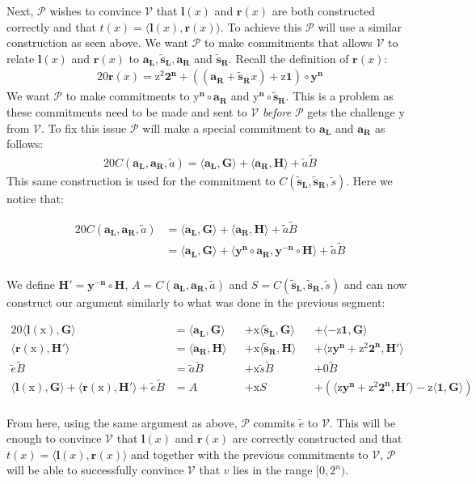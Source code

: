 \documentclass{article}
\newcommand{\eq}[1]{\begin{alignat*}{20}#1\end{alignat*}}
\renewcommand{\vec}[1]{\boldsymbol{#1}}
\newcommand{\ran}[1]{\mathrm{#1}}
\newcommand{\vecran}[1]{\mathbf{#1}}
\newcommand{\V}{\mathcal{V}}
\renewcommand{\P}{\mathcal{P}}
\newcommand{\dotp}[2]{\langle #1, #2 \rangle}
\newcommand{\opn}[1]{\operatorname{#1}}
\newcommand{\vecl}[1]{\vec{#1_{\opn{L}}}}
\newcommand{\vecr}[1]{\vec{#1_{\opn{R}}}}
\newcommand{\blind}[1]{\widetilde{#1}}
\newcommand{\ba}{\blind{a}}
\newcommand{\bB}{\blind{B}}
\newcommand{\be}{\blind{e}}
\newcommand{\bs}{\blind{s}}
\begin{document}
Next, $\P$ wishes to convince $\V$ that $\vec{l}(x)$ and
$\vec{r}(x)$ are both constructed correctly and that $t(x) =
\dotp{\vec{l}(x)}{\vec{r}(x)}$. To achieve this $\P$ will use a similar
construction as seen above. We want $\P$ to make commitments that allows
$\V$ to relate $\vec{l}(x)$ and $\vec{r}(x)$ to $\vecl{a}, \vecl{\bs},
\vecr{a}$ and $\vecr{\bs}$. Recall the definition of $\vec{r}(x)$:
\eq{
	\vec{r}(x) = \ran{z^2}\vec{2^n} + ((\vecr{a} + \vecr{\bs}x) + \ran{z}\vec{1})\circ\vecran{y}^{\vec{n}}
}
We want $\P$ to make commitments to $\vec{\ran{y}^n}\circ
\vecr{a}$ and $\vec{\ran{y}^n}\circ\vecr{\bs}$. This is a problem as these
commitments need to be made and sent to $\V$ \textit{before} $\P$
gets the challenge $\ran{y}$ from $\V$. To fix this issue $\P$ will
make a special commitment to $\vecl{a}$ and $\vecr{a}$ as follows:
\eq{
	C(\vecl{a}, \vecr{a}, \ba) = \dotp{\vecl{a}}{\vec{G}} + \dotp{\vecr{a}}{\vec{H}} + \ba\bB
}
This same construction is used for the commitment to $C(\vecl{\bs},
\vecr{\bs}, \bs)$. Here we notice that:

\eq{
	C(\vecl{a}, \vecr{a}, \ba) &= \dotp{\vecl{a}}{\vec{G}} + \dotp{\vecr{a}}{\vec{H}} + \ba\bB \\
	&= \dotp{\vecl{a}}{\vec{G}} + \dotp{\vecran{y}^{\vec{n}}\circ \vecr{a}}{\vecran{y^{-n}}\circ \vec{H}} + \ba\bB \\
}

\newpage

We define $\vec{H'} = \vecran{y^{-n}}\circ\vec{H}$, $A =
C(\vecl{a},\vecr{a}, \ba)$ and $S = C(\vecl{\bs}, \vecr{\bs},
\bs)$ and can now construct our argument similarly to what
was done in the previous segment:

\eq{
	\dotp{\vec{l}(\ran{x})}{\vec{G}} &= \dotp{\vecl{a}}{\vec{G}} &&+ \ran{x}\dotp{\vecl{\bs}}{\vec{G}} &&+ \dotp{-\ran{z}\vec{1}}{\vec{G}} \\
	\dotp{\vec{r}(\ran{x})}{\vec{H'}} &= \dotp{\vecr{a}}{\vec{H}} &&+ \ran{x}\dotp{\vecr{\bs}}{\vec{H}} &&+ \dotp{\ran{z}\vecran{y}^{\vec{n}} + \ran{z^2}\vec{2^n}}{\vec{H'}}\\
	\be\bB &= \ba\bB &&+ \ran{x}\bs\bB &&+ 0 \bB \\
	\dotp{\vec{l}(\ran{x})}{\vec{G}} + \dotp{\vec{r}(\ran{x})}{\vec{H'}} + \be\bB &= A &&+ \ran{x}S &&+ (\dotp{\ran{z}\vecran{y}^{\vec{n}} + \ran{z^2}\vec{2^n}}{\vec{H'}} - \ran{z}\dotp{\vec{1}}{\vec{G}}) \\
}

From here, using the same argument as above, $\P$ commits $\be$
to $\V$. This will be enough to convince $\V$ that $\vec{l}(x)$
and $\vec{r}(x)$ are correctly constructed and that $t(x) =
\dotp{\vec{l}(x)}{\vec{r}(x)}$ and together with the previous
commitments to $\V$, $\P$ will be able to successfully convince $\V$
that $v$ lies in the range $[0, 2^n)$.
\end{document}
